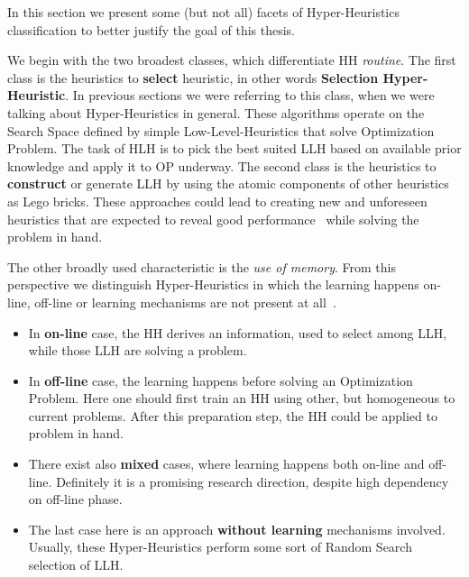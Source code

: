 In this section we present some (but not all) facets of Hyper-Heuristics classification to better justify the goal of this thesis.


We begin with the two broadest classes, which differentiate HH \textit{routine}.
The first class is the heuristics to \textbf{select} heuristic, in other words \textbf{Selection Hyper-Heuristic}. In previous sections we were referring to this class, when we were talking about Hyper-Heuristics in general. These algorithms operate on the Search Space defined by simple Low-Level-Heuristics that solve Optimization Problem. The task of HLH is to pick the best suited LLH based on available prior knowledge and apply it to OP underway.
The second class is the heuristics to \textbf{construct} or generate LLH by using the atomic components of other heuristics as Lego bricks. These approaches could lead to creating new and unforeseen heuristics that are expected to reveal good performance~\cite{burke2019classification} while solving the problem in hand.


The other broadly used characteristic is the \textit{use of memory}. From this perspective we distinguish Hyper-Heuristics in which the learning happens on-line, off-line or learning mechanisms are not present at all~\cite{ryser2014review,burke2019classification}.
\begin{itemize}
	\item In \textbf{on-line} case, the HH derives an information, used to select among LLH, while those LLH are solving a problem.

	\item In \textbf{off-line} case, the learning happens before solving an Optimization Problem. Here one should first train an HH using other, but homogeneous to current problems. After this preparation step, the HH could be applied to problem in hand.

	\item There exist also \textbf{mixed} cases, where learning happens both on-line and off-line. Definitely it is a promising research direction, despite high dependency on off-line phase.
	
	\item The last case here is an approach \textbf{without learning} mechanisms involved. Usually, these Hyper-Heuristics perform some sort of Random Search selection of LLH.
\end{itemize}


